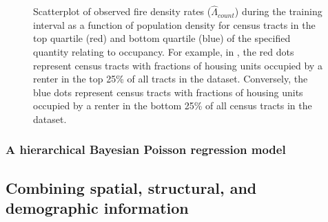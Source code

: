 \documentclass{svjour3}
\begin{document}
\begin{figure}[!htb]
\begin{center}
{          } %
      \end{center}
      \caption{Scatterplot of observed fire density rates ($\hat\Lambda_{count}$) during the training interval as a function of population density for census tracts in the top quartile (red) and bottom quartile (blue) of the specified quantity relating to occupancy. For example, in \protect{}, the red dots represent census tracts with fractions of housing units occupied by a renter in the top 25\% of all tracts in the dataset. Conversely, the blue dots represent census tracts with fractions of housing units occupied by a renter in the bottom 25\% of all census tracts in the dataset.}
     \label{fig:occupancy}
  \end{figure}
 
  \subsubsection{A hierarchical Bayesian Poisson regression model}
  
  
  \subsection{Combining spatial, structural, and demographic information}
  
\end{document}
